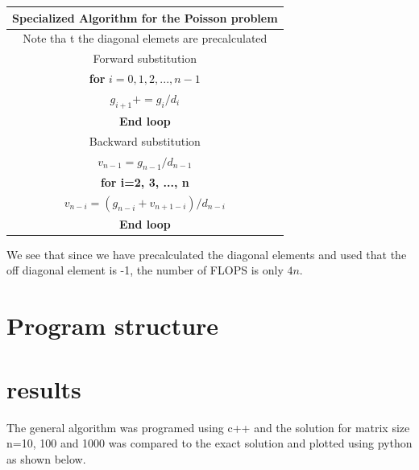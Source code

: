 \documentclass[10pt]{article}
\begin{document}
\begin{center}
  \begin{tabular}{||c||}
    \hline\hline
    \textbf{Specialized Algorithm for the Poisson problem}\\
    \hline\hline Note tha
    t the diagonal elemets are precalculated\\
    Forward substitution \\
    \textbf{for} $i=0,1,2,...,n-1$\\
      $g_{i+1}+=g_i/d_i$\\
      \textbf{End loop} \\
      Backward substitution \\
      $v_{n-1}=g_{n-1}/d_{n-1}$\\
      \textbf{for i=2, 3, ..., n} \\
      $v_{n-i}=(g_{n-i}+v_{n+1-i})/d_{n-i}$\\ 
      \textbf{End loop}\\
      \hline\hline
  \end{tabular}
\end{center}
 We see that since we have precalculated the diagonal elements and used that the off diagonal element is -1, the number of FLOPS is only $4n$.



\section{Program structure}



\section{results}

The general algorithm was programed using c++ and the solution for matrix size n=10, 100 and 1000 was compared to the exact solution and plotted using python as shown below.
\end{document}
